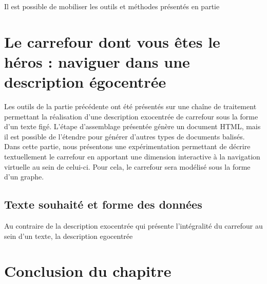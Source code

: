 Il est possible de mobiliser les outils et méthodes présentés en partie 

\todo{}

\section{Le carrefour dont vous êtes le héros  : naviguer dans une description égocentrée}

Les outils de la partie précédente ont été présentés sur une chaîne de traitement permettant la réalisation d'une description exocentrée de carrefour sous la forme d'un texte figé. L'étape d'assemblage présentée génère un document HTML, mais il est possible de l'étendre pour générer d'autres types de documents balisés. Dans cette partie, nous présentons une expérimentation permettant de décrire textuellement le carrefour en apportant une dimension interactive à la navigation virtuelle au sein de celui-ci. Pour cela, le carrefour sera modélisé sous la forme d'un graphe.

\todo{}

\subsection{Texte souhaité et forme des données}

Au contraire de la description exocentrée qui présente l'intégralité du carrefour au sein d'un texte, la description egocentrée 

\todo{}

\section{Conclusion du chapitre}

